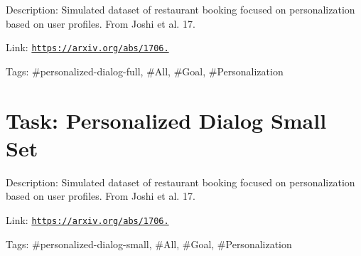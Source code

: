 Description\+: Simulated dataset of restaurant booking focused on personalization based on user profiles. From Joshi et al. \textquotesingle{}17.

Link\+: \href{https://arxiv.org/abs/1706.07503}{\tt https\+://arxiv.\+org/abs/1706.}

Tags\+: \#personalized-\/dialog-\/full, \#\+All, \#\+Goal, \#\+Personalization

\section*{Task\+: Personalized Dialog Small Set }

Description\+: Simulated dataset of restaurant booking focused on personalization based on user profiles. From Joshi et al. \textquotesingle{}17.

Link\+: \href{https://arxiv.org/abs/1706.07503}{\tt https\+://arxiv.\+org/abs/1706.}

Tags\+: \#personalized-\/dialog-\/small, \#\+All, \#\+Goal, \#\+Personalization 